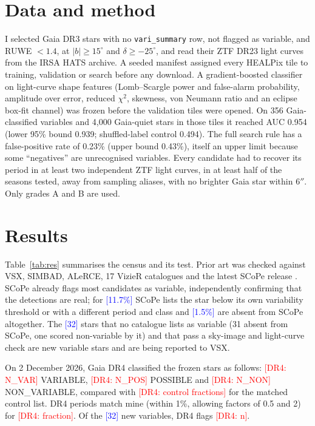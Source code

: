 \documentclass[RNAAS]{aastex701}
\newcommand{\dr}[1]{\textcolor{red}{[DR4: #1]}}
\newcommand{\fz}[1]{\textcolor{blue}{[#1]}}
\begin{document}
\section{Data and method}
I selected Gaia DR3 stars with no \texttt{vari\_summary} row, not flagged as variable, and RUWE $<1.4$, at
$|b|\ge15^\circ$ and $\delta\ge-25^\circ$, and read their ZTF DR23 light curves from the IRSA HATS archive. A
seeded manifest assigned every HEALPix tile to training, validation or search before any download. A gradient-boosted
classifier on light-curve shape features (Lomb--Scargle power and false-alarm probability, amplitude over error,
reduced $\chi^2$, skewness, von Neumann ratio and an eclipse box-fit channel) was frozen before the validation tiles
were opened. On 356 Gaia-classified variables and 4,000 Gaia-quiet stars in those tiles it reached AUC 0.954
(lower 95\% bound 0.939; shuffled-label control 0.494). The full search rule has a false-positive rate of 0.23\%
(upper bound 0.43\%), itself an upper limit because some ``negatives'' are unrecognised variables. Every candidate
had to recover its period in at least two independent ZTF light curves, in at least half of the seasons tested,
away from sampling aliases, with no brighter Gaia star within $6''$. Only grades A and B are used.

\section{Results}
Table~\ref{tab:res} summarises the census and its test. Prior art was checked against VSX, SIMBAD, ALeRCE, 17
VizieR catalogues and the latest SCoPe release \citep{Healy2024}. SCoPe already flags most candidates as
variable, independently confirming that the detections are real; for \fz{11.7\%} SCoPe lists the star below its own variability threshold or with a different period and class
and \fz{1.5\%} are absent from SCoPe altogether. The \fz{32} stars that no catalogue lists as variable (31 absent from SCoPe, one scored non-variable by it) and that pass a sky-image and light-curve check are new
variable stars and are being reported to VSX.

On 2 December 2026, Gaia DR4 \citep{GaiaDR4} classified the frozen stars as follows: \dr{N\_VAR} VARIABLE,
\dr{N\_POS} POSSIBLE and \dr{N\_NON} NON\_VARIABLE, compared with \dr{control fractions} for the matched
control list. DR4 periods match mine (within 1\%, allowing factors of 0.5 and 2) for \dr{fraction}. Of the \fz{32}
new variables, DR4 flags \dr{n}.
\end{document}
